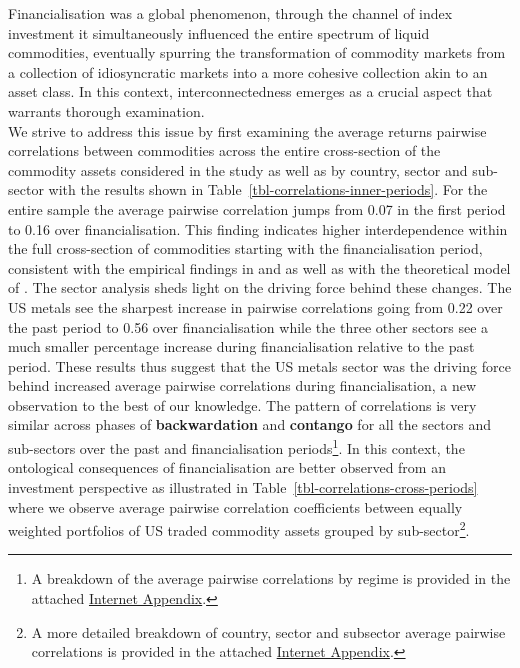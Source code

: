 \documentclass[
  authoryear,
  preprint,
  3p]{elsarticle}
\begin{document}
\medskip

Financialisation was a global phenomenon, through the channel of index
investment it simultaneously influenced the entire spectrum of liquid
commodities, eventually spurring the transformation of commodity markets
from a collection of idiosyncratic markets into a more cohesive
collection akin to an asset class. In this context, interconnectedness
emerges as a crucial aspect that warrants thorough examination.\\
We strive to address this issue by first examining the average returns
pairwise correlations between commodities across the entire
cross-section of the commodity assets considered in the study as well as
by country, sector and sub-sector with the results shown in
Table~\ref{tbl-correlations-inner-periods}. For the entire sample the
average pairwise correlation jumps from 0.07 in the first period to 0.16
over financialisation. This finding indicates higher interdependence
within the full cross-section of commodities starting with the
financialisation period, consistent with the empirical findings in
\citet{fryMcKibbin_evolution_2023} and
\citet{mayer_financialization_2017} as well as with the theoretical
model of \citet{basak_model_2016}. The sector analysis sheds light on
the driving force behind these changes. The US metals see the sharpest
increase in pairwise correlations going from 0.22 over the past period
to 0.56 over financialisation while the three other sectors see a much
smaller percentage increase during financialisation relative to the past
period. These results thus suggest that the US metals sector was the
driving force behind increased average pairwise correlations during
financialisation, a new observation to the best of our knowledge. The
pattern of correlations is very similar across phases of
\textbf{backwardation} and \textbf{contango} for all the sectors and
sub-sectors over the past and financialisation periods\footnote{A
  breakdown of the average pairwise correlations by regime is provided
  in the attached
  \href{https://bautheac.shinyapps.io/co-movement/}{Internet Appendix}.}.
In this context, the ontological consequences of financialisation are
better observed from an investment perspective as illustrated in
Table~\ref{tbl-correlations-cross-periods} where we observe average
pairwise correlation coefficients between equally weighted portfolios of
US traded commodity assets grouped by sub-sector\footnote{A more
  detailed breakdown of country, sector and subsector average pairwise
  correlations is provided in the attached
  \href{https://bautheac.shinyapps.io/co-movement/}{Internet Appendix}.}.
\end{document}
